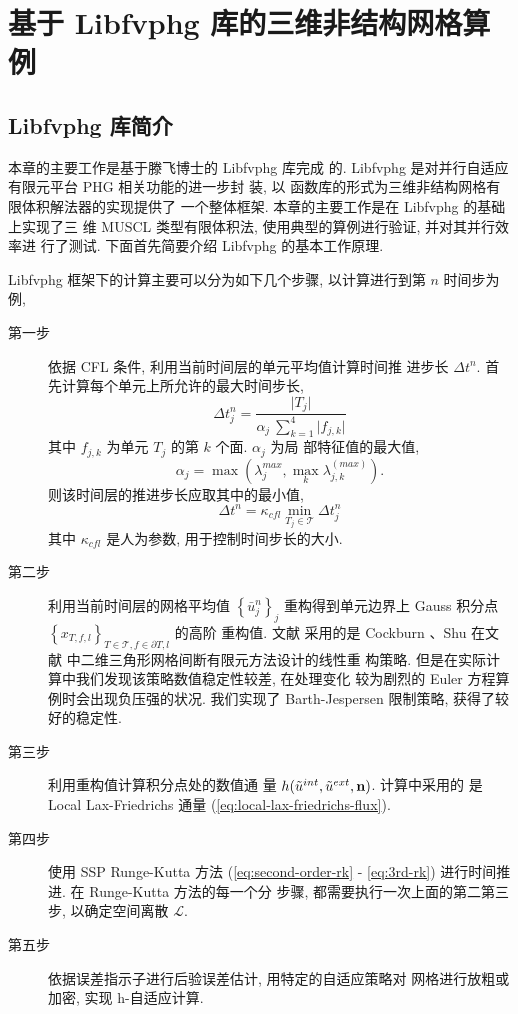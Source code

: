 
\chapter{基于 Libfvphg 库的三维非结构网格算例}
\label{chap:libfvphg-improve}

\section{Libfvphg 库简介}
\label{sec:phg--libfvphg}

本章的主要工作是基于滕飞博士的 Libfvphg \cite{tengfei2010} 库完成
的. Libfvphg 是对并行自适应有限元平台 PHG 相关功能的进一步封
装, 以 \Cpp 函数库的形式为三维非结构网格有限体积解法器的实现提供了
一个整体框架. 本章的主要工作是在 Libfvphg 的基础上实现了三
维 MUSCL 类型有限体积法, 使用典型的算例进行验证, 并对其并行效率进
行了测试. 下面首先简要介绍 Libfvphg 的基本工作原理.

Libfvphg 框架下的计算主要可以分为如下几个步骤, 以计算进行到第 $n$
时间步为例,
\begin{description}
\item[第一步] 依据 CFL 条件, 利用当前时间层的单元平均值计算时间推
  进步长 $\Delta t ^{n}$. 首先计算每个单元上所允许的最大时间步长,
  \begin{equation}
    \label{eq:cfl-condition}
    \Delta t^{n}_{j} =  \frac{\vert T_{j}
      \vert}{\alpha_{j} ~ \sum_{k=1}^{4}\vert f_{j,k} \vert}
  \end{equation}
  其中 $f_{j,k}$ 为单元 $T_{j}$ 的第 $k$ 个面. $\alpha_{j}$ 为局
  部特征值的最大值,
  \begin{equation}
    \label{eq:local-maximum-eigen}
    \alpha_{j} = \max (\lambda_{j}^{max}, \max_{k} \lambda_{j,k}^{(max)}).
  \end{equation}
  则该时间层的推进步长应取其中的最小值,
  \begin{equation}
    \label{eq:minimal-time-step}
    \Delta t^{n} = \kappa_{{cfl}} \min_{T_{j} \in
      \mathcal{T}} \Delta t^{n}_{j}
  \end{equation}
  其中 $\kappa_{{cfl}}$ 是人为参数, 用于控制时间步长的大小.
\item[第二步] 利用当前时间层的网格平均值 $\left\{ \bar{u}^{n}_{j}
  \right\}_{j}$ 重构得到单元边界上 Gauss 积分点 $\left\{ x_{T,
      f,l} \right\}_{T \in \mathcal{T},f \in \partial T,l}$ 的高阶
  重构值. 文献 \cite{tengfei2010} 采用的是 Cockburn 、Shu 在文
  献\cite{Cockburn1998} 中二维三角形网格间断有限元方法设计的线性重
  构策略. 但是在实际计算中我们发现该策略数值稳定性较差, 在处理变化
  较为剧烈的 Euler 方程算例时会出现负压强的状况. 我们实现了
  Barth-Jespersen 限制策略, 获得了较好的稳定性.
\item[第三步] 利用重构值计算积分点处的数值通
  量 $h(\tilde{u}^{int},\tilde{u}^{ext},{\bf{n}})$. 计算中采用的
  是 Local
  Lax-Friedrichs 通量
  (\ref{eq:local-lax-friedrichs-flux}).
\item[第四步] 使用 SSP Runge-Kutta 方法 (\ref{eq:second-order-rk}
  - \ref{eq:3rd-rk}) 进行时间推进. 在 Runge-Kutta 方法的每一个分
  步骤, 都需要执行一次上面的第二第三步, 以确定空间离散 $\mathcal{L}$.
\item[第五步] 依据误差指示子进行后验误差估计, 用特定的自适应策略对
  网格进行放粗或加密, 实现 h-自适应计算.
\end{description}

